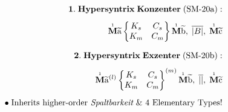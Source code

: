 \documentclass[preview]{standalone}
\begin{document}
\begin{align*}
\special{dvisvgm:raw <g id='unique000'>}\mathbf{1.\;Hypersyntrix\;Konzenter\;(\text{SM-20a}):}\\[4pt]\overset{\scriptscriptstyle 1}{\mathbf{M}}\widetilde{\mathrm{a}} \begin{Bmatrix} K_s & C_s \\ K_m & C_m \end{Bmatrix} \overset{\scriptscriptstyle 1}{\mathbf{M}}\widetilde{\mathrm{b}},\;\overline{|B|},\;\overset{\scriptscriptstyle 1}{\mathbf{M}}\widetilde{\mathrm{c}}\\[7pt]\mathbf{2.\;Hypersyntrix\;Exzenter\;(\text{SM-20b}):}\\[4pt]\overset{\scriptscriptstyle 1}{\mathbf{M}}\widetilde{\mathrm{a}}^{(l)} \begin{Bmatrix} K_s & C_s \\ K_m & C_m \end{Bmatrix}^{(m)} \overset{\scriptscriptstyle 1}{\mathbf{M}}\widetilde{\mathrm{b}},\;\overline{||},\;\overset{\scriptscriptstyle 1}{\mathbf{M}}\widetilde{\mathrm{c}}\\[5pt]\bullet\;\text{Inherits higher-order }\textit{Spaltbarkeit}\text{ \& 4 Elementary Types!}\special{dvisvgm:raw </g>}
\end{align*}
\end{document}
